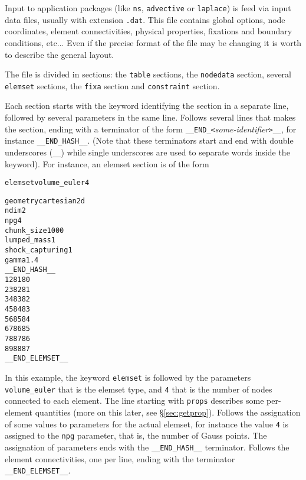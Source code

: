 
%
Input to application packages (like \verb+ns+, \verb+advective+ or
\verb+laplace+) is feed via input data files, usually with extension
\verb+.dat+. This file contains global options, node coordinates,
element connectivities, physical properties, fixations and boundary
conditions, etc... Even if the precise format of the file may be
changing it is worth to describe the general layout. 

The file is divided in sections: the 
\verb+table+ sections, the \verb+nodedata+ section, several
\verb+elemset+ sections, the \verb+fixa+ section and \verb+constraint+
section. 

Each section starts with the keyword identifying the section in a
separate line, followed by several parameters in the same
line. Follows several lines that makes the section, ending with a
terminator of the form \verb+__END_<+\emph{some-identifier}\verb+>__+,
for instance \verb+__END_HASH__+. (Note that these terminators
start and end with double underscores (\verb+__+) while single underscores are
used to separate words inside the keyword).  For instance, an elemset
section is of the form

\begin{alltt}
elemset volume_euler 4

geometry cartesian2d
ndim 2
npg 4
chunk_size 1000
lumped_mass 1
shock_capturing 1
gamma 1.4
__END_HASH__
    1    2   81   80
    2    3   82   81
    3    4   83   82
    4    5   84   83
    5    6   85   84
    6    7   86   85
    7    8   87   86
    8    9   88   87
__END_ELEMSET__
\end{alltt}

In this example, the keyword \verb+elemset+ is followed by the
parameters \verb+volume_euler+ that is the elemset type, and
\verb+4+ that is the number of nodes connected to each element. The
line starting with \verb+props+ 
describes some per-element quantities (more on this later, see
\S\ref{sec:getprop}). Follows the assignation of some values to
parameters for the actual elemset, for instance the value \verb+4+ is
assigned to the \verb+npg+ parameter, that is, the number of Gauss
points. The assignation of parameters ends with the \verb+__END_HASH__+
terminator. Follows the element connectivities, one per line, ending
with the terminator \verb+__END_ELEMSET__+. 

